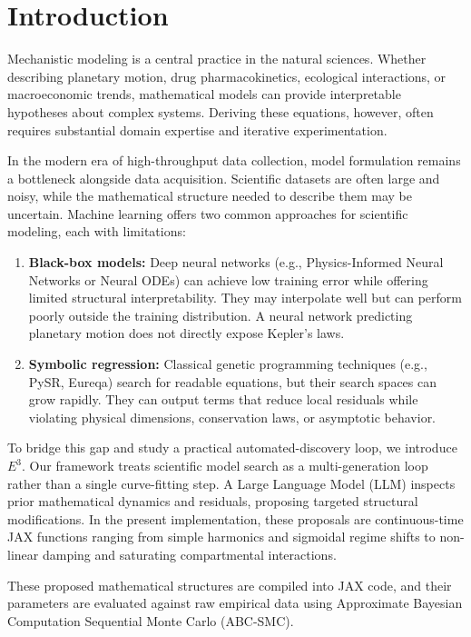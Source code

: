 \section{Introduction}
\label{sec:intro}

Mechanistic modeling is a central practice in the natural sciences. Whether describing planetary motion, drug pharmacokinetics, ecological interactions, or macroeconomic trends, mathematical models can provide interpretable hypotheses about complex systems. Deriving these equations, however, often requires substantial domain expertise and iterative experimentation.

In the modern era of high-throughput data collection, model formulation remains a bottleneck alongside data acquisition. Scientific datasets are often large and noisy, while the mathematical structure needed to describe them may be uncertain. Machine learning offers two common approaches for scientific modeling, each with limitations:

\begin{enumerate}
    \item \textbf{Black-box models:} Deep neural networks (e.g., Physics-Informed Neural Networks or Neural ODEs) can achieve low training error while offering limited structural interpretability. They may interpolate well but can perform poorly outside the training distribution. A neural network predicting planetary motion does not directly expose Kepler's laws.
    \item \textbf{Symbolic regression:} Classical genetic programming techniques (e.g., PySR, Eureqa) search for readable equations, but their search spaces can grow rapidly. They can output terms that reduce local residuals while violating physical dimensions, conservation laws, or asymptotic behavior.
\end{enumerate}

To bridge this gap and study a practical automated-discovery loop, we introduce \textbf{$E^3$}. Our framework treats scientific model search as a multi-generation loop rather than a single curve-fitting step. A Large Language Model (LLM) inspects prior mathematical dynamics and residuals, proposing targeted structural modifications. In the present implementation, these proposals are continuous-time JAX functions ranging from simple harmonics and sigmoidal regime shifts to non-linear damping and saturating compartmental interactions.

These proposed mathematical structures are compiled into JAX code, and their parameters are evaluated against raw empirical data using Approximate Bayesian Computation Sequential Monte Carlo (ABC-SMC).

